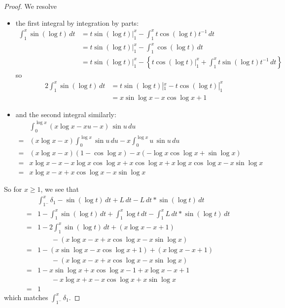 \documentclass[12pt]{article}
\begin{document}
\begin{proof}
We resolve
\begin{itemize}
\item the first integral by integration by parts:
\begin{align*}
\int_1^x \sin(\log t) \, dt &= t \sin(\log t)|_1^x - \int_1^x t \cos(\log t) t^{-1} \, dt\\
&= t \sin(\log t)|_1^x - \int_1^x \cos(\log t) \, dt\\
&= t \sin(\log t)|_1^x - \left\{t \cos(\log t)|_1^x + \int_1^x t \sin(\log t) t^{-1} \, dt \right\}
\end{align*}
so
\begin{align*}
2 \int_1^x \sin(\log t) \, dt &= t \sin(\log t)|_1^x - t \cos(\log t)|_1^x\\
&= x \sin \log x - x \cos \log x + 1
\end{align*}

\item and the second integral similarly:
\begin{align*}
&\int_0^{\log x} (x \log x - x u - x) \, \sin u \, du\\
=& (x \log x - x) \int_0^{\log x} \sin u \, du - x \int_0^{\log x} u \, \sin u \, du\\
=& (x \log x - x) (1 - \cos \log x) - x (-\log x \cos \log x + \sin \log x)\\
=& x \log x - x  - x \log x \cos \log x + x \cos \log x + x \log x \cos \log x - x \sin \log x\\
=& x \log x - x  + x \cos \log x - x \sin \log x
\end{align*}
\end{itemize}

So for $x \geq 1$, we see that
\begin{align*}
&\int_{1^-}^x \delta_1 - \sin(\log t) \, dt + L \, dt - L\,dt * \sin(\log t) \, dt\\
=& 1 - \int_1^x \sin(\log t) \, dt + \int_1^x \log t \, dt - \int_1^x L\,dt * \sin(\log t) \, dt\\
=& 1 - 2 \int_1^x \sin(\log t) \, dt + (x \log x - x + 1) \\
& \qquad - (x \log x - x  + x \cos \log x - x \sin \log x)\\
=& 1 - (x \sin \log x - x \cos \log x + 1) + (x \log x - x + 1) \\
& \qquad - (x \log x - x  + x \cos \log x - x \sin \log x)\\
=& 1 - x \sin \log x + x \cos \log x - 1 + x \log x - x + 1 \\
& \qquad - x \log x + x - x \cos \log x + x \sin \log x\\
=& 1
\end{align*}
which matches $\int_{1^-}^x \delta_1$.
\end{proof}

\unless\ifdefined\IsMainDocument
\end{document}
